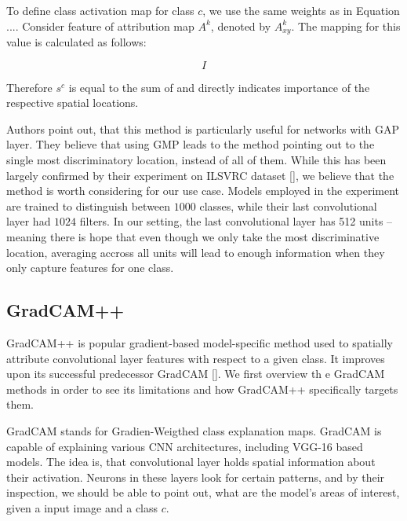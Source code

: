 To define class activation map for class $c$, we use the same weights as in Equation .... Consider feature of attribution map $A^k$, denoted by $A^k_{xy}$. The mapping for this value is calculated as follows:

\begin{equation}
    I
\end{equation}

Therefore $s^c$ is equal to the sum of  and directly indicates importance of the respective spatial locations.\newline

\noindent
Authors point out, that this method is particularly useful for networks with GAP layer. They believe that using GMP leads to the method pointing out to the single most discriminatory location, instead of all of them. While this has been largely confirmed by their experiment on ILSVRC dataset [], we believe that the method is worth considering for our use case. Models employed in the experiment are trained to distinguish between $1000$ classes, while their last convolutional layer had $1024$ filters. In our setting, the last convolutional layer has 512 units -- meaning there is hope that even though we only take the most discriminative location, averaging accross all units will lead to enough information when they only capture features for one class.




\subsection{GradCAM++}

GradCAM++ is popular gradient-based model-specific method used to spatially attribute convolutional layer features with respect to a given class. It improves upon its successful predecessor GradCAM []. We first overview th e GradCAM methods in order to see its limitations and how GradCAM++ specifically targets them.


GradCAM stands for Gradien-Weigthed class explanation maps. GradCAM is capable of explaining various CNN architectures, including VGG-16 based models. The idea is, that convolutional layer holds spatial information about their activation. Neurons in these layers look for certain patterns, and by their inspection, we should be able to point out, what are the model's areas of interest, given a input image and a class $c$.

